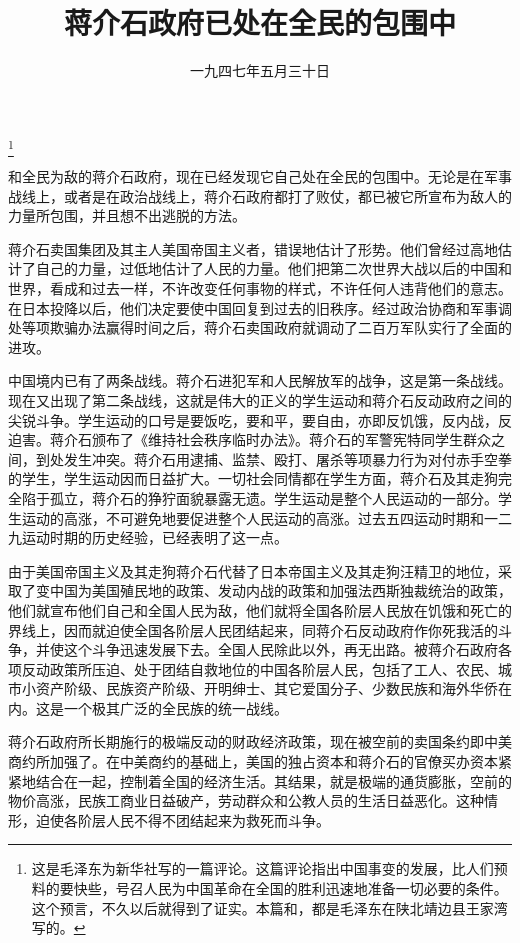 
\title{蒋介石政府已处在全民的包围中}
\date{一九四七年五月三十日}
\thanks{这是毛泽东为新华社写的一篇评论。这篇评论指出中国事变的发展，比人们预料的要快些，号召人民为中国革命在全国的胜利迅速地准备一切必要的条件。这个预言，不久以后就得到了证实。本篇和，都是毛泽东在陕北靖边县王家湾写的。}
\maketitle


和全民为敌的蒋介石政府，现在已经发现它自己处在全民的包围中。无论是在军事战线上，或者是在政治战线上，蒋介石政府都打了败仗，都已被它所宣布为敌人的力量所包围，并且想不出逃脱的方法。

蒋介石卖国集团及其主人美国帝国主义者，错误地估计了形势。他们曾经过高地估计了自己的力量，过低地估计了人民的力量。他们把第二次世界大战以后的中国和世界，看成和过去一样，不许改变任何事物的样式，不许任何人违背他们的意志。在日本投降以后，他们决定要使中国回复到过去的旧秩序。经过政治协商和军事调处等项欺骗办法赢得时间之后，蒋介石卖国政府就调动了二百万军队实行了全面的进攻。

中国境内已有了两条战线。蒋介石进犯军和人民解放军的战争，这是第一条战线。现在又出现了第二条战线，这就是伟大的正义的学生运动和蒋介石反动政府之间的尖锐斗争。学生运动的口号是要饭吃，要和平，要自由，亦即反饥饿，反内战，反迫害。蒋介石颁布了《维持社会秩序临时办法》。蒋介石的军警宪特同学生群众之间，到处发生冲突。蒋介石用逮捕、监禁、殴打、屠杀等项暴力行为对付赤手空拳的学生，学生运动因而日益扩大。一切社会同情都在学生方面，蒋介石及其走狗完全陷于孤立，蒋介石的狰狞面貌暴露无遗。学生运动是整个人民运动的一部分。学生运动的高涨，不可避免地要促进整个人民运动的高涨。过去五四运动时期和一二九运动时期的历史经验，已经表明了这一点。

由于美国帝国主义及其走狗蒋介石代替了日本帝国主义及其走狗汪精卫的地位，采取了变中国为美国殖民地的政策、发动内战的政策和加强法西斯独裁统治的政策，他们就宣布他们自己和全国人民为敌，他们就将全国各阶层人民放在饥饿和死亡的界线上，因而就迫使全国各阶层人民团结起来，同蒋介石反动政府作你死我活的斗争，并使这个斗争迅速发展下去。全国人民除此以外，再无出路。被蒋介石政府各项反动政策所压迫、处于团结自救地位的中国各阶层人民，包括了工人、农民、城市小资产阶级、民族资产阶级、开明绅士、其它爱国分子、少数民族和海外华侨在内。这是一个极其广泛的全民族的统一战线。

蒋介石政府所长期施行的极端反动的财政经济政策，现在被空前的卖国条约即中美商约所加强了。在中美商约的基础上，美国的独占资本和蒋介石的官僚买办资本紧紧地结合在一起，控制着全国的经济生活。其结果，就是极端的通货膨胀，空前的物价高涨，民族工商业日益破产，劳动群众和公教人员的生活日益恶化。这种情形，迫使各阶层人民不得不团结起来为救死而斗争。

